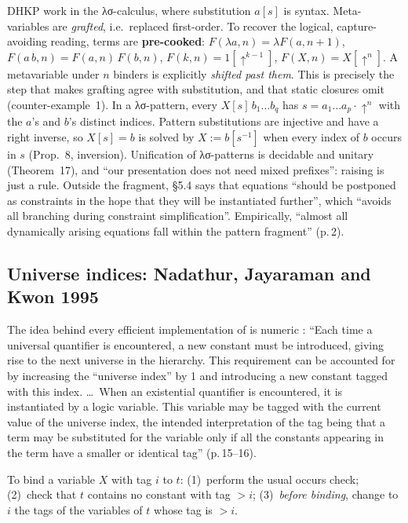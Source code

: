 DHKP \cite{DowekHardinKirchnerPfenning1996} work in the λσ-calculus, where substitution $a[s]$ is
syntax. Meta-variables are \emph{grafted}, i.e.\ replaced first-order. To recover the logical,
capture-avoiding reading, terms are \textbf{pre-cooked}:
$F(\lambda a,n)=\lambda F(a,n+1)$, $F(a\,b,n)=F(a,n)\,F(b,n)$, $F(k,n)=1[\uparrow^{k-1}]$,
$F(X,n)=X[\uparrow^n]$. A metavariable under $n$ binders is explicitly \emph{shifted past them}. This
is precisely the step that makes grafting agree with substitution, and that static closures omit
(counter-ex\-am\-ple~1). In a λσ-pattern, every $X[s]\,b_1\dots b_q$ has $s=a_1\dots a_p\cdot\uparrow^n$
with the $a$'s and $b$'s distinct indices. Pattern substitutions are injective and have a right
inverse, so $X[s]=b$ is solved by $X:=b[s^{-1}]$ when every index of $b$ occurs in $s$ (Prop.~8,
inversion). Unification of λσ-patterns is decidable and unitary (Theorem~17), and \enquote{our
presentation does not need mixed prefixes}: raising is just a rule. Outside the fragment, §5.4 says
that equations \enquote{should be postponed as constraints in the hope that they will be instantiated
further}, which \enquote{avoids all branching during constraint simplification}. Empirically,
\enquote{almost all dynamically arising equations fall within the pattern fragment} (p.\,2).

\subsection{Universe indices: Nadathur, Jayaraman and Kwon 1995}

The idea behind every efficient implementation of  is numeric
\cite{NadathurJayaramanKwon1995}: \enquote{Each time a universal quantifier is encountered, a new
constant must be introduced, giving rise to the next universe in the hierarchy. This requirement can be
accounted for by increasing the “universe index” by 1 and introducing a new constant tagged with this
index. \dots\ When an existential quantifier is encountered, it is instantiated by a logic variable.
This variable may be tagged with the current value of the universe index, the intended interpretation
of the tag being that a term may be substituted for the variable only if all the constants appearing in
the term have a smaller or identical tag} (p.\,15--16).

\begin{definition}\label{def:lkanren-ui}
To bind a variable $X$ with tag $i$ to $t$:
(1)~perform the usual occurs check; (2)~check that $t$ contains no constant with tag $>i$; (3)~\emph{before binding}, change to $i$ the tags of the variables of $t$ whose tag is $>i$.
\end{definition}

